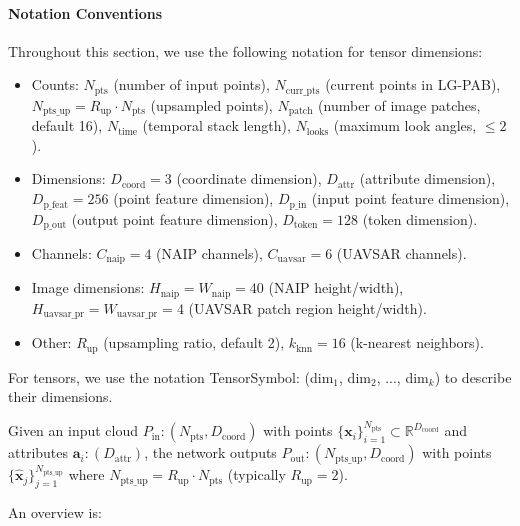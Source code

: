 \documentclass[remotesensing,article,submit,pdftex,moreauthors]{Definitions/mdpi}
\begin{document}
\paragraph{Notation Conventions}
Throughout this section, we use the following notation for tensor dimensions:
\begin{itemize}
    \item Counts: $N_{\text{pts}}$ (number of input points), $N_{\text{curr\_pts}}$ (current points in LG-PAB), $N_{\text{pts\_up}} = R_{\text{up}} \cdot N_{\text{pts}}$ (upsampled points), $N_{\text{patch}}$ (number of image patches, default 16), $N_{\text{time}}$ (temporal stack length), $N_{\text{looks}}$ (maximum look angles, $\leq 2$).
    \item Dimensions: $D_{\text{coord}} = 3$ (coordinate dimension), $D_{\text{attr}}$ (attribute dimension), $D_{\text{p\_feat}} = 256$ (point feature dimension), $D_{\text{p\_in}}$ (input point feature dimension), $D_{\text{p\_out}}$ (output point feature dimension), $D_{\text{token}} = 128$ (token dimension).
    \item Channels: $C_{\text{naip}} = 4$ (NAIP channels), $C_{\text{uavsar}} = 6$ (UAVSAR channels).
    \item Image dimensions: $H_{\text{naip}} = W_{\text{naip}} = 40$ (NAIP height/width), $H_{\text{uavsar\_pr}} = W_{\text{uavsar\_pr}} = 4$ (UAVSAR patch region height/width).
    \item Other: $R_{\text{up}}$ (upsampling ratio, default 2), $k_{\text{knn}} = 16$ (k-nearest neighbors).
\end{itemize}
For tensors, we use the notation TensorSymbol: (dim$_1$, dim$_2$, ..., dim$_k$) to describe their dimensions.

Given an input cloud $P_{\text{in}}: (N_{\text{pts}}, D_{\text{coord}})$ with points $\{\mathbf{x}_i\}_{i=1}^{N_{\text{pts}}}\subset\mathbb{R}^{D_{\text{coord}}}$ and attributes $\mathbf{a}_i: (D_{\text{attr}})$, the network outputs $P_{\text{out}}: (N_{\text{pts\_up}}, D_{\text{coord}})$ with points $\{\hat{\mathbf{x}}_j\}_{j=1}^{N_{\text{pts\_up}}}$ where $N_{\text{pts\_up}} = R_{\text{up}} \cdot N_{\text{pts}}$ (typically $R_{\text{up}} = 2$).

An overview is:
\end{document}
